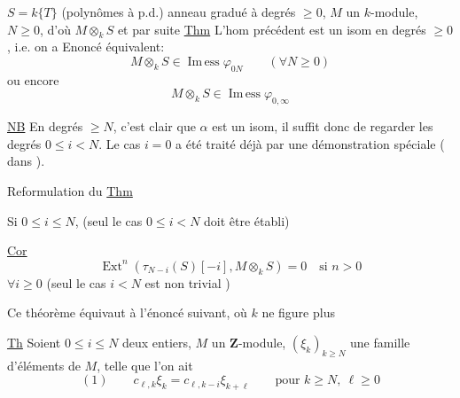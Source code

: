 $S=k\{T\}$ (polynômes à p.d.) anneau gradué à degrés $\geq0$,
$M$ un $k$-module, $N\geq0$, d'où $M\otimes_kS$ et par suite
\uline{Thm} L'hom précédent est un isom en degrés $\geq0$, i.e. on a
Enoncé équivalent:
\[
M\otimes_kS\in\operatorname{Im\,ess}\varphi_{0N}\qquad(\forall N\geq0)
\]
ou encore
\[
M\otimes_kS\in\operatorname{Im\,ess}\varphi_{0,\infty}
\]

\uline{NB} En degrés $\geq N$, c'est clair que $\alpha$ est un isom, il suffit donc de regarder les degrés $0\leq i<N$. Le cas $i=0$ a été traité déjà par une démonstration spéciale ( dans ).

Reformulation du \uline{Thm}

Si $0\leq i\leq N$, 
(seul le cas $0\leq i<N$ doit être établi)

\uline{Cor}
\[
\operatorname{Ext}^n(\tau_{N-i}(S)[-i],M\otimes_kS)=0\quad\text{si }n>0
\]
$\forall i\geq0$ (seul le cas $i<N$ est non trivial )

Ce théorème équivaut à l'énoncé suivant, où $k$ ne figure plus

\uline{Th} Soient $0\leq i\leq N$ deux entiers, $M$ un $\mathbf Z$-module, $(\xi_k)_{k\geq N}$ une famille d'éléments de $M$, telle que l'on ait
\[
(1)\qquad c_{\ell,k}\xi_k=c_{\ell,k-i}\xi_{k+\ell}\qquad\text{pour }k\geq N,\ \ell\geq0
\]
